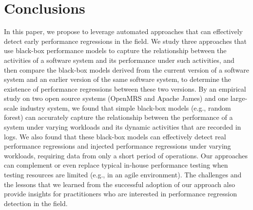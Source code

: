 \section{Conclusions} \label{sec:conclusions}

In this paper, we propose to leverage automated approaches
that can effectively detect early performance regressions in the field. 
We study three approaches that use black-box performance models to capture the relationship between the activities of a software system and its performance under such activities, and then compare the black-box models derived from the current version of a software system and an earlier version of the same software system, to determine the existence of performance regressions between these two versions.
By an empirical study on two open source systems (OpenMRS and Apache James) and one large-scale industry system, we found that simple black-box models (e.g., random forest) can accurately capture the relationship between the performance of a system under varying workloads and its dynamic activities that are recorded in logs.
We also found that these black-box models can effectively detect real performance regressions and injected performance regressions under varying workloads, requiring data from only a short period of operations.
Our approaches can complement or even replace typical in-house performance testing when testing resources are limited (e.g., in an agile environment).
The challenges and the lessons that we learned from the successful adoption of our approach also provide insights for practitioners who are interested in performance regression detection in the field.